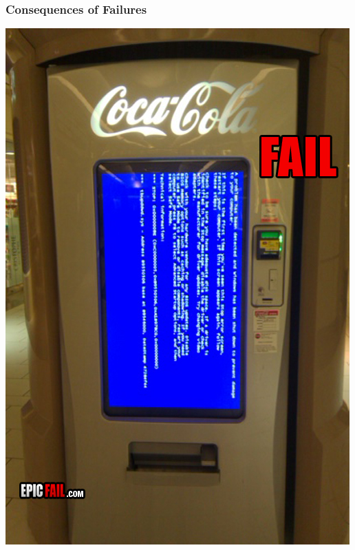 \documentclass{beamer}
\newenvironment{changemargin}[1]{%
  \begin{list}{}{%
    \setlength{\topsep}{0pt}%
    \setlength{\leftmargin}{#1}%
    \setlength{\rightmargin}{1em}
    \setlength{\listparindent}{\parindent}%
    \setlength{\itemindent}{\parindent}%
    \setlength{\parsep}{\parskip}%
  }%
  \item[]}{\end{list}}
\begin{document}
\begin{frame}
  \frametitle{Consequences of Failures}


  \Large
  \begin{changemargin}{2em}

\begin{center}
\includegraphics[height=.5\textheight]{L01/vending-machine-fail.jpg}~~

\end{center}
\end{changemargin}
\end{frame}
\end{document}
